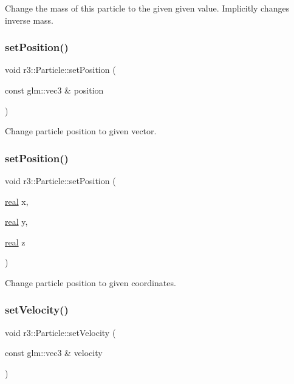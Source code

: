 Change the mass of this particle to the given given value. Implicitly changes inverse mass. \mbox{\label{classr3_1_1_particle_a22926644001b62f3e8bf1f9cf02b64e9}} 
\subsubsection{\texorpdfstring{set\+Position()}{setPosition()}\hspace{0.1cm}{\footnotesize\ttfamily [1/2]}}
{\footnotesize\ttfamily void r3\+::\+Particle\+::set\+Position (\begin{DoxyParamCaption}\item[{const glm\+::vec3 \&}]{position }\end{DoxyParamCaption})}

Change particle position to given vector. \mbox{\label{classr3_1_1_particle_ac0d83f2396049b51383c692a70c44b34}} 
\subsubsection{\texorpdfstring{set\+Position()}{setPosition()}\hspace{0.1cm}{\footnotesize\ttfamily [2/2]}}
{\footnotesize\ttfamily void r3\+::\+Particle\+::set\+Position (\begin{DoxyParamCaption}\item[{\mbox{\hyperlink{namespacer3_ab2016b3e3f743fb735afce242f0dc1eb}{real}}}]{x,  }\item[{\mbox{\hyperlink{namespacer3_ab2016b3e3f743fb735afce242f0dc1eb}{real}}}]{y,  }\item[{\mbox{\hyperlink{namespacer3_ab2016b3e3f743fb735afce242f0dc1eb}{real}}}]{z }\end{DoxyParamCaption})}

Change particle position to given coordinates. \mbox{\label{classr3_1_1_particle_ae0e84b5875dcf2dc6850ba8698f8f936}} 
\subsubsection{\texorpdfstring{set\+Velocity()}{setVelocity()}\hspace{0.1cm}{\footnotesize\ttfamily [1/2]}}
{\footnotesize\ttfamily void r3\+::\+Particle\+::set\+Velocity (\begin{DoxyParamCaption}\item[{const glm\+::vec3 \&}]{velocity }\end{DoxyParamCaption})}

